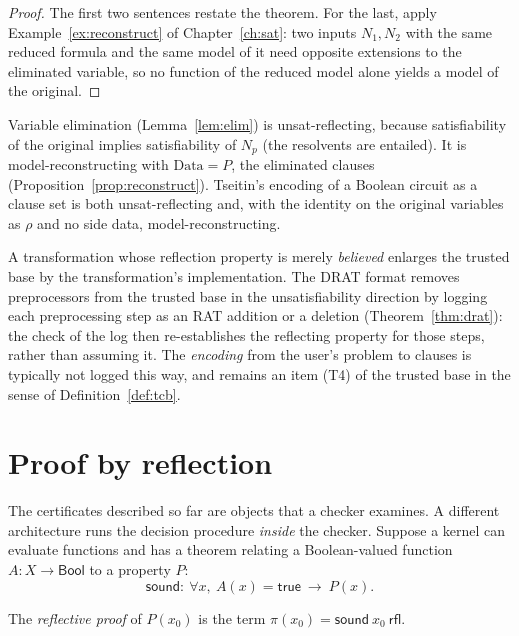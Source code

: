 \begin{proof}
The first two sentences restate the theorem. For the last, apply Example~\ref{ex:reconstruct} of Chapter~\ref{ch:sat}: two inputs $N_1,N_2$ with the same reduced formula and the same model of it need opposite extensions to the eliminated variable, so no function of the reduced model alone yields a model of the original.
\end{proof}

\begin{example}
\label{ex:reflecting-source}
Variable elimination (Lemma~\ref{lem:elim}) is unsat-reflecting, because satisfiability of the original implies satisfiability of $N_p$ (the resolvents are entailed). It is model-reconstructing with $\mathrm{Data}=P$, the eliminated clauses (Proposition~\ref{prop:reconstruct}). Tseitin's encoding of a Boolean circuit as a clause set is both unsat-reflecting and, with the identity on the original variables as $\rho$ and no side data, model-reconstructing.
\end{example}

A transformation whose reflection property is merely \emph{believed} enlarges the trusted base by the transformation's implementation. The DRAT format removes preprocessors from the trusted base in the unsatisfiability direction by logging each preprocessing step as an RAT addition or a deletion (Theorem~\ref{thm:drat}): the check of the log then re-establishes the reflecting property for those steps, rather than assuming it. The \emph{encoding} from the user's problem to clauses is typically not logged this way, and remains an item (T4) of the trusted base in the sense of Definition~\ref{def:tcb}.

\section{Proof by reflection}
\label{sec:reflection}

The certificates described so far are objects that a checker examines. A different architecture runs the decision procedure \emph{inside} the checker. Suppose a kernel can evaluate functions and has a theorem relating a Boolean-valued function $A:X\to\mathsf{Bool}$ to a property $P$:
\[
\mathsf{sound}:\ \forall x,\ A(x)=\mathsf{true}\ \to\ P(x).
\]

\begin{definition}
\label{def:reflective}
The \emph{reflective proof} of $P(x_0)$ is the term $\pi(x_0)=\mathsf{sound}\ x_0\ \mathsf{rfl}$.
\end{definition}

